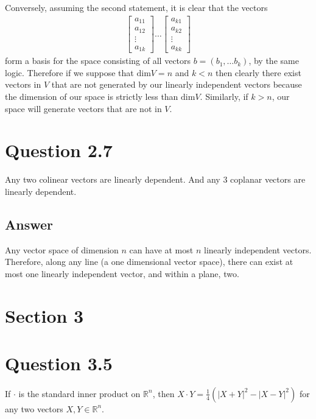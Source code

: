 \documentclass[
	12pt, %
]{fphw}
\begin{document}
Conversely, assuming the second statement, it is clear that the vectors
\begin{align*}
     \begin{bmatrix}
           a_{11} \\
           a_{12} \\
           \vdots \\
           a_{1k}
         \end{bmatrix} \dots
     \begin{bmatrix}
	     a_{k1} \\
	     a_{k2} \\
	     \vdots \\
	     a_{kk}
     \end{bmatrix}
  \end{align*}
  form a basis for the space consisting of all vectors $b=(b_1, \dots b_k)$,
  by the same logic. Therefore if we suppose that $\text{dim}V=n$ and $k<n$
  then clearly there exist vectors in $V$ that are not generated by our linearly independent vectors because the dimension of our space is strictly less than $\text{dim}V$. Similarly, if $k>n$, our space will generate vectors that are not in $V$.
\section*{Question 2.7}
\begin{problem}
	Any two colinear vectors are linearly dependent. And any 3 coplanar vectors are 
	linearly dependent. 
\end{problem}
\subsection*{Answer}
	Any vector space of dimension $n$ can have at most $n$ linearly independent vectors. Therefore, along any line (a one dimensional vector space), there can exist at most one linearly independent vector, and within a plane, two. 
\section*{Section 3}
\section*{Question 3.5}
\begin{problem}
	If $\cdot$ is the standard inner product on $\mathbb{R}^n$, then 
	$X \cdot Y = \frac{1}{4}(|X+Y|^2-|X-Y|^2)$
for any two vectors $X, Y \in \mathbb{R}^n$.
\end{problem}
\end{document}
